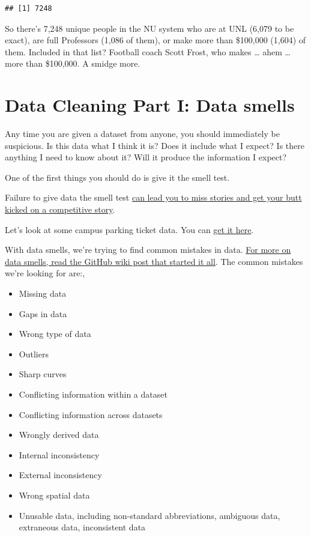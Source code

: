 \documentclass[]{book}
\providecommand{\tightlist}{%
  \setlength{\itemsep}{0pt}\setlength{\parskip}{0pt}}
\begin{document}
\begin{verbatim}
## [1] 7248
\end{verbatim}

So there's 7,248 unique people in the NU system who are at UNL (6,079 to be exact), are full Professors (1,086 of them), or make more than \$100,000 (1,604) of them. Included in that list? Football coach Scott Frost, who makes \ldots{} ahem \ldots{} more than \$100,000. A smidge more.

\hypertarget{data-cleaning-part-i-data-smells}{%
\chapter{Data Cleaning Part I: Data smells}\label{data-cleaning-part-i-data-smells}}

Any time you are given a dataset from anyone, you should immediately be suspicious. Is this data what I think it is? Does it include what I expect? Is there anything I need to know about it? Will it produce the information I expect?

One of the first things you should do is give it the smell test.

Failure to give data the smell test \href{https://source.opennews.org/en-US/learning/handling-data-about-race-and-ethnicity/}{can lead you to miss stories and get your butt kicked on a competitive story}.

Let's look at some campus parking ticket data. You can \href{https://unl.box.com/s/3c5kx2i5iouc52ty46k4js412u48yajr}{get it here}.

With data smells, we're trying to find common mistakes in data. \href{https://github.com/nikeiubel/data-smells/wiki/Ensuring-Accuracy-in-Data-Journalism}{For more on data smells, read the GitHub wiki post that started it all}. The common mistakes we're looking for are:,

\begin{itemize}
\tightlist
\item
  Missing data
\item
  Gaps in data
\item
  Wrong type of data
\item
  Outliers
\item
  Sharp curves
\item
  Conflicting information within a dataset
\item
  Conflicting information across datasets
\item
  Wrongly derived data
\item
  Internal inconsistency
\item
  External inconsistency
\item
  Wrong spatial data
\item
  Unusable data, including non-standard abbreviations, ambiguous data, extraneous data, inconsistent data
\end{itemize}
\end{document}
